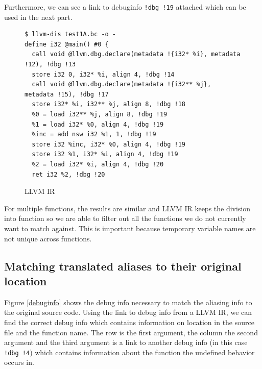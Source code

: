 Furthermore, we can see a link to debuginfo \verb|!dbg !19| attached which can be used in the next part.
\begin{figure}
\caption{LLVM IR}
\label{llvmir}
\begin{lstlisting}
$ llvm-dis test1A.bc -o -
define i32 @main() #0 {
  call void @llvm.dbg.declare(metadata !{i32* %i}, metadata !12), !dbg !13
  store i32 0, i32* %i, align 4, !dbg !14
  call void @llvm.dbg.declare(metadata !{i32** %j}, metadata !15), !dbg !17
  store i32* %i, i32** %j, align 8, !dbg !18
  %0 = load i32** %j, align 8, !dbg !19
  %1 = load i32* %0, align 4, !dbg !19
  %inc = add nsw i32 %1, 1, !dbg !19
  store i32 %inc, i32* %0, align 4, !dbg !19
  store i32 %1, i32* %i, align 4, !dbg !19
  %2 = load i32* %i, align 4, !dbg !20
  ret i32 %2, !dbg !20
\end{lstlisting}
\end{figure}

For multiple functions, the results are similar and LLVM IR keeps the division into function so we are able to filter out all the functions we do not currently want to match against. This is important because temporary variable names are not unique across functions.

\subsection{Matching translated aliases to their original location}
Figure \ref{debuginfo} shows the debug info necessary to match the aliasing info to the original source code. Using the link to debug info from a LLVM IR, we can find the correct debug info which contains information on location in the source file and the function name. The row is the first argument, the column the second argument and the third argument is a link to another debug info (in this case \verb|!dbg !4|) which contains information about the function the undefined behavior occurs in.

